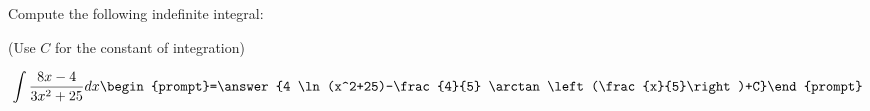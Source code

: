\documentclass{ximera}
\author{Jim Talamo}
\begin{document}
\begin{exercise}
Compute the following indefinite integral:

\begin{prompt} (Use $C$ for the constant of integration) \end{prompt}

\[
\int \frac{8x-4}{3x^2+25} dx 
\begin{prompt}=\answer{4 \ln(x^2+25)-\frac{4}{5} \arctan\left(\frac{x}{5}\right)+C}\end{prompt}
\]
\end{exercise}
\end{document}

